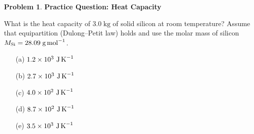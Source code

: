\documentclass[12pt]{article}
\theoremstyle{definition} %
\newtheorem{problem}{Problem}
\theoremstyle{plain} %
\begin{document}
                            \begin{problem}
                              \textbf{Practice Question: Heat Capacity}
                            
                              What is the heat capacity of \(3.0\;\text{kg}\) of solid silicon at room
                              temperature?  Assume that equipartition (Dulong–Petit law) holds
                              and use the molar mass of silicon \(M_{\mathrm{Si}} = 28.09\;\text{g\,mol}^{-1}\).
                            
                              \begin{enumerate}
                                \item[(a)] \(1.2 \times 10^{3}\ \text{J\,K}^{-1}\)
                                \item[(b)] \(2.7 \times 10^{3}\ \text{J\,K}^{-1}\)
                                \item[(c)] \(4.0 \times 10^{2}\ \text{J\,K}^{-1}\)
                                \item[(d)] \(8.7 \times 10^{2}\ \text{J\,K}^{-1}\)
                                \item[(e)] \(3.5 \times 10^{3}\ \text{J\,K}^{-1}\)
                              \end{enumerate}
                            \end{problem}
\end{document}
